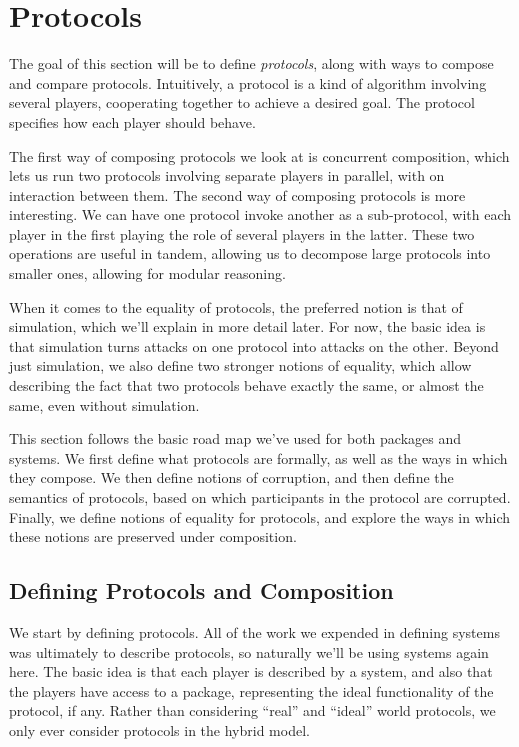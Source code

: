 \section{Protocols}

The goal of this section will be to define \emph{protocols},
along with ways to compose and compare protocols.
Intuitively, a protocol is a kind of algorithm involving several
players, cooperating together to achieve a desired goal.
The protocol specifies how each player should behave.

The first way of composing protocols we look at is concurrent composition,
which lets us run two protocols involving separate players in parallel,
with on interaction between them.
The second way of composing protocols is more interesting.
We can have one protocol invoke another as a sub-protocol,
with each player in the first playing the role of several players
in the latter.
These two operations are useful in tandem, allowing
us to decompose large protocols into smaller ones,
allowing for modular reasoning.

When it comes to the equality of protocols,
the preferred notion is that of simulation,
which we'll explain in more detail later.
For now, the basic idea is that simulation
turns attacks on one protocol into attacks on the other.
Beyond just simulation, we also define two stronger
notions of equality,
which allow describing the fact that two protocols behave exactly the same,
or almost the same, even without simulation.

This section follows the basic road map we've used for both packages
and systems.
We first define what protocols are formally, as well as the ways
in which they compose.
We then define notions of corruption, and then define the semantics
of protocols, based on which participants in the protocol
are corrupted.
Finally, we define notions of equality for protocols,
and explore the ways in which these notions are preserved under composition.

\subsection{Defining Protocols and Composition}

We start by defining protocols.
All of the work we expended in defining systems was ultimately
to describe protocols,
so naturally we'll be using systems again here.
The basic idea is that each player is described by a system,
and also that the players have access to a package,
representing the ideal functionality of the protocol,
if any.
Rather than considering ``real'' and ``ideal'' world protocols,
we only ever consider protocols in the hybrid model.

